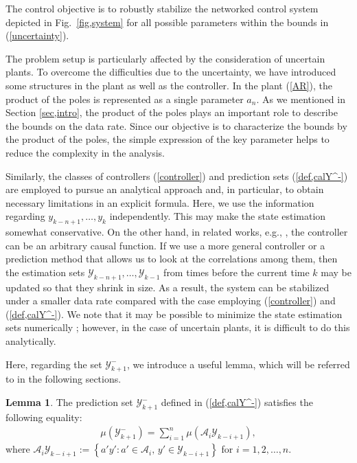 \documentclass[a4paper, 11pt]{article}
\newcommand{\calY}{\mathcal{Y}}
\newcommand{\calA}{\mathcal{A}}
\theoremstyle{definition}
\newtheorem{lem}{Lemma}
\newcommand{\fref}[1]{Fig.~\ref{#1}}
\begin{document}
The control objective is to robustly stabilize the networked control
system depicted in \fref{fig,system} for all possible parameters
within the bounds in (\ref{uncertainty}).


The problem setup is particularly affected by the consideration
of uncertain plants.
To overcome the difficulties due to the uncertainty, we have introduced some structures in the
plant as well as the controller.
In the plant (\ref{AR}), the product of the poles is represented as a single
parameter $a_{n}$.
As we mentioned  in Section \ref{sec,intro}, the product of the poles plays
an important role to describe the bounds on the data rate.
Since our objective is to characterize the bounds by the product of
the poles, the simple expression of the key parameter helps to
reduce the complexity in the analysis.


Similarly, the classes of controllers (\ref{controller}) and prediction sets
(\ref{def,calY^-}) are employed to pursue an analytical approach and,
in particular, to obtain necessary limitations in an explicit formula.
Here, we use the information regarding $y_{k-n+1},\dots,y_{k}$ independently.
This may make the state estimation somewhat conservative.
On the other hand, in related works, e.g., \cite{Tatikonda2004, Nair2004, You2010},
the controller can be an arbitrary causal function.
If we use a more general controller or a prediction method that allows us to
look at the correlations among them, then the estimation sets
$\calY_{k-n+1},\dots,\calY_{k-1}$ from times before the current time $k$
may be updated so that they shrink in size.
As a result, the system can be stabilized under a smaller data rate compared
with the case employing (\ref{controller}) and (\ref{def,calY^-}).
We note that it may be possible to minimize the state estimation sets numerically \cite{Rohn1989};
however, in the case of uncertain plants, it is difficult to do this analytically.

Here, regarding the set $\calY_{k+1}^-$, we introduce a useful lemma,
which will be referred to in the following sections.
\begin{lem}\label{lem,BM}
 The prediction set $\calY_{k+1}^-$ defined in (\ref{def,calY^-})
satisfies the following equality:
 \begin{align}
 \mu(\calY^-_{k+1})
 =\sum_{i=1}^n\mu\left(\calA_i\calY_{k-i+1}\right),\label{BM}
\end{align}
where $\calA_i\calY_{k-i+1} := \left\{a'y' : a'\in\calA_i,\,y'\in\calY_{k-i+1}\right\}$
for $i=1,2,\dots,n$.
\end{lem}
\end{document}
